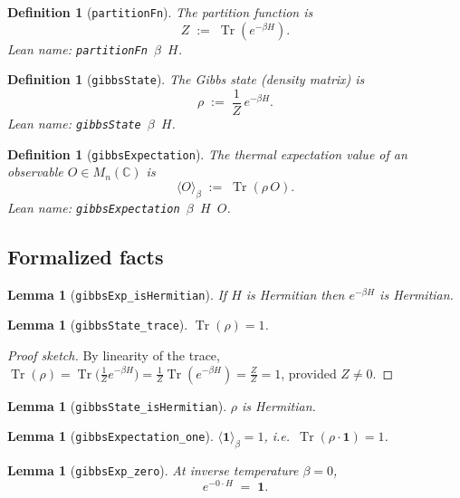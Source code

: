 \documentclass[a4paper,11pt]{article}
\newtheorem{lemma}[theorem]{Lemma}
\newtheorem{definition}[theorem]{Definition}
\begin{document}
\begin{definition}[\texttt{partitionFn}]
The \emph{partition function} is
\[
  Z \;:=\; \operatorname{Tr}(e^{-\beta H}).
\]
Lean name: \texttt{partitionFn~$\beta$~$H$}.
\end{definition}

\begin{definition}[\texttt{gibbsState}]
The \emph{Gibbs state} (density matrix) is
\[
  \rho \;:=\; \frac{1}{Z}\,e^{-\beta H}.
\]
Lean name: \texttt{gibbsState~$\beta$~$H$}.
\end{definition}

\begin{definition}[\texttt{gibbsExpectation}]
The \emph{thermal expectation value} of an observable $O \in M_n(\mathbb{C})$
is
\[
  \langle O \rangle_\beta \;:=\; \operatorname{Tr}(\rho\, O).
\]
Lean name: \texttt{gibbsExpectation~$\beta$~$H$~$O$}.
\end{definition}

\subsection{Formalized facts}

\begin{lemma}[\texttt{gibbsExp\_isHermitian}]
If $H$ is Hermitian then $e^{-\beta H}$ is Hermitian.
\end{lemma}

\begin{lemma}[\texttt{gibbsState\_trace}]
$\operatorname{Tr}(\rho) = 1$.
\end{lemma}

\begin{proof}[Proof sketch]
By linearity of the trace,
$\operatorname{Tr}(\rho)
 = \operatorname{Tr}\!\bigl(\tfrac{1}{Z} e^{-\beta H}\bigr)
 = \tfrac{1}{Z}\operatorname{Tr}(e^{-\beta H})
 = \tfrac{Z}{Z} = 1$,
provided $Z \neq 0$.
\end{proof}

\begin{lemma}[\texttt{gibbsState\_isHermitian}]
$\rho$ is Hermitian.
\end{lemma}

\begin{lemma}[\texttt{gibbsExpectation\_one}]
$\langle \mathbf{1} \rangle_\beta = 1$, i.e.\
$\operatorname{Tr}(\rho \cdot \mathbf{1}) = 1$.
\end{lemma}

\begin{lemma}[\texttt{gibbsExp\_zero}]
At inverse temperature $\beta = 0$,
\[
  e^{-0 \cdot H} \;=\; \mathbf{1}.
\]
\end{lemma}
\end{document}
